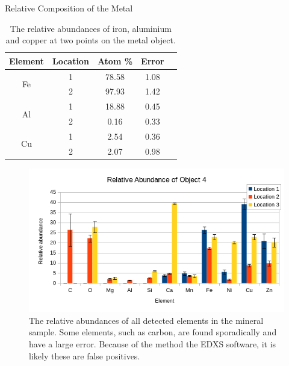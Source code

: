 \documentclass[10pt]{IEEEtran}
\begin{document}
            \begin{table}[!hpbt]
      \begin{center}
        \normalsize{Relative Composition of the Metal}
        \begin{tabular}{|c|c|c|c|c|}	
		   \hline        	
		   Element & Location & Atom \% & Error \\
            \hline
            \multirow{2}{*}{Fe} & 1 & 78.58 & 1.08 \\
            \hhline{~----}
	        & 2 & 97.93 & 1.42 \\
	        \hline
            \multirow{2}{*}{Al} & 1 & 18.88 & 0.45 \\
            \hhline{~----}
            & 2 & 0.16 & 0.33 \\
            \hline           
            \multirow{2}{*}{Cu} & 1 & 2.54 & 0.36 \\
            \hhline{~----}
            & 2 & 2.07 & 0.98 \\
            \hline           
       \end{tabular}
       \caption{The relative abundances of iron, aluminium and copper at two points on the metal object.}
       \label{tab:object3}
      \end{center}
    \end{table}
    
\begin{figure}[!h]
       \begin{center}
       \includegraphics[width=\columnwidth]{Object4Analysis}
       \caption{The relative abundances of all detected elements in the mineral sample. Some elements, such as carbon, are found sporadically and have a large error. Because of the method the EDXS software, it is likely these are false positives.}
       \label{fig:all}
       \end{center}
\end{figure}
           
\end{document}
